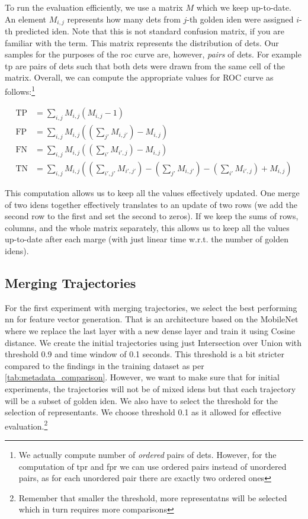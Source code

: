 To run the evaluation efficiently, we use a matrix $M$ which we keep up-to-date. An element $M_{i,j}$ represents how many \glspl{det} from $j$-th golden \gls{iden} were assigned $i$-th predicted \gls{iden}. Note that this is not standard confusion matrix, if you are familiar with the term. This matrix represents the distribution of \glspl{det}. Our samples for the purposes of the \gls{roc} curve are, however, \emph{pairs} of \glspl{det}. For example \gls{tp} are pairs of \glspl{det} such that both \glspl{det} were drawn from the same cell of the matrix. Overall, we can compute the appropriate values for ROC curve as follows:\footnote{We actually compute number of \emph{ordered} pairs of \glspl{det}. However, for the computation of \gls{tpr} and \gls{fpr} we can use ordered pairs instead of unordered pairs, as for each unordered pair there are exactly two ordered ones}

\begin{align*}
    \mathrm{TP} &= \sum_{i,j} M_{i,j} (M_{i,j} - 1)\\
    \mathrm{FP} &= \sum_{i,j} M_{i,j} \left(\left(\sum_{j'}M_{i,j'}\right)-M_{i,j}\right)\\
    \mathrm{FN} &= \sum_{i,j} M_{i,j} \left(\left(\sum_{i'}M_{i',j}\right)-M_{i,j}\right)\\
    \mathrm{TN} &= \sum_{i,j} M_{i,j} \left(\left(\sum_{i',j'}M_{i',j'}\right) - \left(\sum_{j'}M_{i,j'}\right) - \left(\sum_{i'}M_{i',j}\right) + M_{i,j}\right)
\end{align*}

This computation allows us to keep all the values effectively updated. One merge of two \glspl{iden} together effectively translates to an update of two rows (we add the second row to the first and set the second to zeros). If we keep the sums of rows, columns, and the whole matrix separately, this allows us to keep all the values up-to-date after each marge (with just linear time w.r.t. the number of golden \glspl{iden}).

\subsection{Merging Trajectories}

For the first experiment with merging trajectories, we select the best performing \gls{nn} for feature vector generation. That is an architecture based on the MobileNet where we replace the last layer with a new dense layer and train it using Cosine distance. We create the initial trajectories using just Intersection over Union with threshold 0.9 and time window of 0.1 seconds. This threshold is a bit stricter compared to the findings in the training dataset as per 
\autoref{tab:metadata_comparison}. However, we want to make sure that for initial experiments, the trajectories will not be of mixed \glspl{iden} but that each trajectory will be a subset of golden \gls{iden}. We also have to select the threshold for the selection of representants. We choose threshold 0.1 as it allowed for effective evaluation.\footnote{Remember that smaller the threshold, more representatns will be selected which in turn requires more comparisons}


